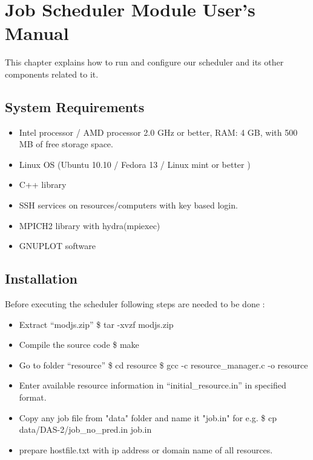 \chapter{Job Scheduler Module User's Manual}
\label{userman}
This chapter explains how to run and configure our scheduler and its other components related to it. 
\section{System Requirements}
\begin{itemize}
\item Intel processor / AMD processor 2.0 GHz or better, RAM: 4 GB, with 500 MB of free storage space.
\item Linux OS (Ubuntu 10.10 / Fedora 13 / Linux mint or better )
\item C++ library
\item SSH services on resources/computers with key based login.
\item MPICH2 library with hydra(mpiexec) \cite{mpich2}
\item GNUPLOT software
\end{itemize}

\section{Installation}
Before executing the scheduler following steps are needed to be done :
\begin{itemize}
\item Extract ``modjs.zip'' 
\subitem \$ tar -xvzf modjs.zip
\item Compile the source code
\subitem \$ make
\item Go to folder ``resource''
\subitem \$ cd resource
\subitem \$ gcc -c resource\_manager.c -o resource
\item Enter available resource information in ``initial\_resource.in'' in specified format.
\item Copy any job file from "data" folder and name it "job.in" for e.g.
\subitem \$ cp data/DAS-2/job\_no\_pred.in job.in
\item prepare hostfile.txt with ip address or domain name of all resources.
\end{itemize}

